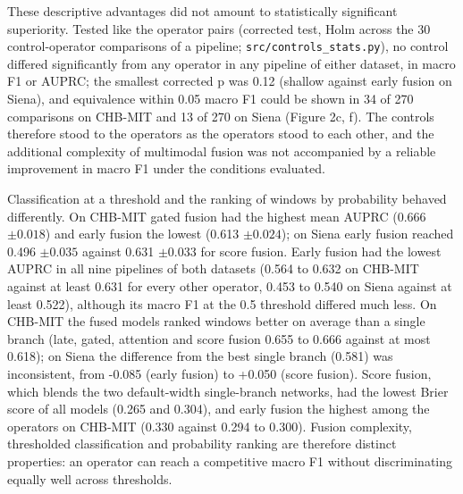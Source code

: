 \documentclass[11pt,a4paper]{article}
\begin{document}
These descriptive advantages did not amount to statistically significant superiority.
Tested like the operator pairs (corrected test, Holm across the 30 control-operator
comparisons of a pipeline; \nolinkurl{src/controls_stats.py}), no control differed significantly
from any operator in any pipeline of either dataset, in macro F1 or AUPRC; the smallest
corrected p was 0.12 (shallow against early fusion on Siena), and equivalence within
0.05 macro F1 could be shown in 34 of 270 comparisons on CHB-MIT and 13 of 270 on Siena
(Figure 2c, f). The controls therefore stood to the operators as the operators stood to
each other, and the additional complexity of multimodal fusion was not accompanied by a
reliable improvement in macro F1 under the conditions evaluated.

Classification at a threshold and the ranking of windows by probability behaved
differently. On CHB-MIT gated fusion had the highest mean AUPRC (0.666 \(\pm 0.018\)) and early
fusion the lowest (0.613 \(\pm 0.024\)); on Siena early fusion reached 0.496 \(\pm 0.035\) against
0.631 \(\pm 0.033\) for score fusion. Early fusion had the lowest AUPRC in all nine pipelines
of both datasets (0.564 to 0.632 on CHB-MIT against at least 0.631 for every other
operator, 0.453 to 0.540 on Siena against at least 0.522), although its macro F1 at the
0.5 threshold differed much less. On CHB-MIT the fused models ranked windows better on
average than a single branch (late, gated, attention and score fusion 0.655 to 0.666
against at most 0.618); on Siena the difference from the best single branch (0.581) was
inconsistent, from -0.085 (early fusion) to +0.050 (score fusion). Score fusion, which
blends the two default-width single-branch networks, had the lowest Brier score of all
models (0.265 and 0.304), and early fusion the highest among the operators on CHB-MIT
(0.330 against 0.294 to 0.300). Fusion complexity, thresholded classification and
probability ranking are therefore distinct properties: an operator can reach a
competitive macro F1 without discriminating equally well across thresholds.

\begingroup\small
\end{document}
